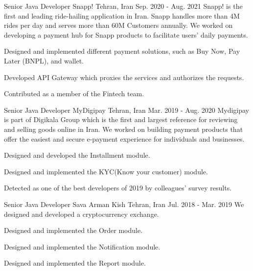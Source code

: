 \begin{cventries}
  \cventry
    {Senior Java Developer} %
    {Snapp!} %
    {Tehran, Iran} %
    {Sep. 2020 - Aug. 2021} %
    {
      Snapp! is the first and leading ride-hailing application in Iran. Snapp handles more than 4M rides per day and serves more than 60M Customers annually.
      We worked on developing a payment hub for Snapp products to facilitate users' daily payments.
    }
    {
      \begin{cvitems} %
        \item {Designed and implemented different payment solutions, such as Buy Now, Pay Later (BNPL), and wallet.}
        \item {Developed API Gateway which proxies the services and authorizes the requests.}
        \item {Contributed as a member of the Fintech team.}
      \end{cvitems}
    }

  \cventry
    {Senior Java Developer} %
    {MyDigipay} %
    {Tehran, Iran} %
    {Mar. 2019 - Aug. 2020} %
    {
      Mydigipay is part of Digikala Group which is the first and largest reference for reviewing and selling goods online in Iran.
      We worked on building payment products that offer the easiest and secure e-payment experience for individuals and businesses.
    }
    {
      \begin{cvitems} %
        \item {Designed and developed the Installment module.}
        \item {Designed and implemented the KYC(Know your customer) module.}
        \item {Detected as one of the best developers of 2019 by colleagues' survey results.}
      \end{cvitems}
    }

  \cventry
    {Senior Java Developer} %
    {Sava Arman Kish} %
    {Tehran, Iran} %
    {Jul. 2018 - Mar. 2019} %
    {
      We designed and developed a cryptocurrency exchange.
    }
    {
      \begin{cvitems} %
        \item {Designed and implemented the Order module.}
        \item {Designed and implemented the Notification module.}
        \item {Designed and implemented the Report module.}
      \end{cvitems}
    }


\end{cventries}
